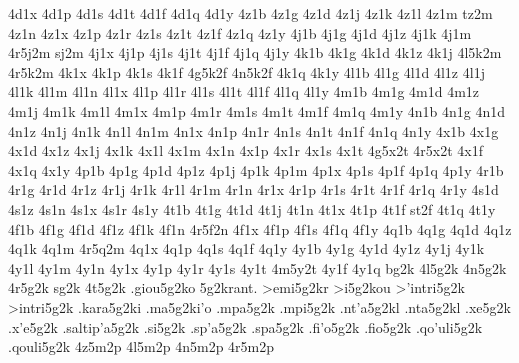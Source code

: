 {%
4d1x
4d1p
4d1s
4d1t
4d1f
4d1q
4d1y
4z1b %
4z1g %
4z1d
4z1j
4z1k
4z1l
4z1m
tz2m %
4z1n
4z1x
4z1p
4z1r
4z1s
4z1t
4z1f
4z1q
4z1y
4j1b
4j1g
4j1d
4j1z
4j1k
4j1m
4r5j2m %
sj2m   %
4j1x
4j1p
4j1s
4j1t
4j1f
4j1q
4j1y
4k1b %
4k1g
4k1d
4k1z
4k1j
4l5k2m %
4r5k2m %
4k1x
4k1p
4k1s
4k1f
4g5k2f %
4n5k2f %
4k1q
4k1y
4l1b
4l1g
4l1d
4l1z
4l1j
4l1k
4l1m
4l1n
4l1x
4l1p
4l1r
4l1s
4l1t
4l1f
4l1q
4l1y
4m1b
4m1g
4m1d
4m1z
4m1j
4m1k
4m1l
4m1x
4m1p
4m1r
4m1s
4m1t
4m1f
4m1q
4m1y
4n1b
4n1g
4n1d
4n1z
4n1j
4n1k
4n1l
4n1m
4n1x
4n1p
4n1r
4n1s
4n1t
4n1f
4n1q
4n1y
4x1b
4x1g
4x1d
4x1z
4x1j
4x1k
4x1l
4x1m
4x1n
4x1p
4x1r
4x1s
4x1t
4g5x2t %
4r5x2t %
4x1f
4x1q
4x1y
4p1b
4p1g
4p1d
4p1z
4p1j
4p1k
4p1m
4p1x
4p1s
4p1f
4p1q
4p1y
4r1b
4r1g
4r1d
4r1z
4r1j
4r1k
4r1l
4r1m
4r1n
4r1x
4r1p
4r1s
4r1t
4r1f
4r1q
4r1y
4s1d %
4s1z 
4s1n %
4s1x
4s1r
4s1y
4t1b
4t1g
4t1d
4t1j
4t1n
4t1x
4t1p
4t1f
st2f %
4t1q
4t1y
4f1b
4f1g
4f1d
4f1z
4f1k %
4f1n
4r5f2n %
4f1x
4f1p
4f1s
4f1q
4f1y
4q1b
4q1g
4q1d
4q1z
4q1k
4q1m
4r5q2m %
4q1x
4q1p
4q1s
4q1f
4q1y
4y1b
4y1g
4y1d
4y1z
4y1j
4y1k
4y1l
4y1m
4y1n
4y1x
4y1p
4y1r
4y1s
4y1t
4m5y2t %
4y1f
4y1q
bg2k
4l5g2k
4n5g2k
4r5g2k
sg2k
4t5g2k
.giou5g2ko   %
5g2krant.    %
>emi5g2kr    %
>i5g2kou     %
>'intri5g2k  %
>intri5g2k
.kara5g2ki   %
.ma5g2ki'o   %
.mpa5g2k     %
.mpi5g2k     %
.nt'a5g2kl   %
.nta5g2kl    %
.xe5g2k      %
.x'e5g2k
.saltip'a5g2k %
.si5g2k      %
.sp'a5g2k    %
.spa5g2k
.fi'o5g2k    %
.fio5g2k
.qo'uli5g2k  %
.qouli5g2k
4z5m2p
4l5m2p
4n5m2p
4r5m2p
}
